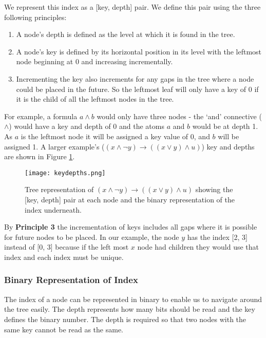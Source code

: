\documentclass[draft]{report}
\begin{document}
We represent this index as a [key, depth] pair. We define this pair using the three following principles:

\begin{enumerate}[leftmargin=*, align=left, label=\bfseries Principle \arabic*:]
\item A node's depth is defined as the level at which it is found in the tree. 

\item A node's key is defined by its horizontal position in its level with the leftmost node beginning at 0 and increasing incrementally.

\item Incrementing the key also increments for any gaps in the tree where a node could be placed in the future. So the leftmost leaf will only have a key of 0 if it is the child of all the leftmost nodes in the tree.
\end{enumerate}

For example, a formula $a\land b$ would only have three nodes - the `and' connective ($\land$) would have a key and depth of 0 and the atoms $a$ and $b$ would be at depth 1. As $a$ is the leftmost node it will be assigned a key value of 0, and $b$ will be assigned 1. A larger example's ($(x\land\lnot y)\rightarrow((x\lor y)\land u)$) key and depths are shown in Figure \ref{keydepths}. 

\begin{figure}[ht]
    \centering
    \texttt{[image: keydepths.png]}
    \caption{Tree representation of $(x\land\lnot y)\rightarrow((x\lor y)\land u)$ showing the [key, depth] pair at each node and the binary representation of the index underneath.}
    \label{keydepths}
\end{figure}

By \textbf{Principle 3} the incrementation of keys includes all gaps where it is possible for future nodes to be placed. In our example, the node $y$ has the index [2, 3] instead of [0, 3] because if the left most $x$ node had children they would use that index and each index must be unique.

\subsubsection{Binary Representation of Index}

The index of a node can be represented in binary to enable us to navigate around the tree easily. The depth represents how many bits should be read and the key defines the binary number. The depth is required so that two nodes with the same key cannot be read as the same. 
\end{document}
